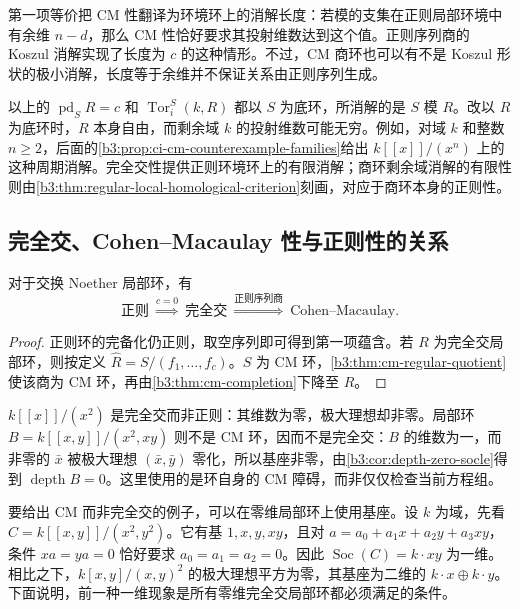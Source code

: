 第一项等价把 CM 性翻译为环境环上的消解长度：若模的支集在正则局部环境中有余维 \(n-d\)，那么 CM 性恰好要求其投射维数达到这个值。正则序列商的 Koszul 消解实现了长度为 \(c\) 的这种情形。不过，CM 商环也可以有不是 Koszul 形状的极小消解，长度等于余维并不保证关系由正则序列生成。

\ProseParagraphBreak
以上的 \(\operatorname{pd}_SR=c\) 和 \(\operatorname{Tor}_i^S(k,R)\) 都以 \(S\) 为底环，所消解的是 \(S\) 模 \(R\)。改以 \(R\) 为底环时，\(R\) 本身自由，而剩余域 \(k\) 的投射维数可能无穷。例如，对域 \(k\) 和整数 \(n\ge2\)，后面的\cref{b3:prop:ci-cm-counterexample-families}给出 \(k[\![x]\!]/(x^n)\) 上的这种周期消解。完全交性提供正则环境环上的有限消解；商环剩余域消解的有限性则由\cref{b3:thm:regular-local-homological-criterion}刻画，对应于商环本身的正则性。

\subsection{完全交、Cohen–Macaulay 性与正则性的关系}
\label{b3:subsec:1903:03}

\begin{theorem}\label{b3:thm:complete-intersection-cm}
	对于交换 Noether 局部环，有
	\[
		\text{正则}\ \overset{c=0}{\Longrightarrow}\ \text{完全交} \ \overset{\text{正则序列商}}{\Longrightarrow}\ \text{Cohen--Macaulay}.
	\]
\end{theorem}
\begin{proof}
	正则环的完备化仍正则，取空序列即可得到第一项蕴含。若 \(R\) 为完全交局部环，则按定义 \(\widehat R=S/(f_1,\ldots,f_c)\)。\(S\) 为 CM 环，\cref{b3:thm:cm-regular-quotient}使该商为 CM 环，再由\cref{b3:thm:cm-completion}下降至 \(R\)。
\end{proof}

\(k[\![x]\!]/(x^2)\) 是完全交而非正则：其维数为零，极大理想却非零。局部环 \(B=k[\![x,y]\!]/(x^2,xy)\) 则不是 CM 环，因而不是完全交：\(B\) 的维数为一，而非零的 \(\bar x\) 被极大理想 \((\bar x,\bar y)\) 零化，所以基座非零，由\cref{b3:cor:depth-zero-socle}得到 \(\operatorname{depth}B=0\)。这里使用的是环自身的 CM 障碍，而非仅仅检查当前方程组。

\ProseParagraphBreak
要给出 CM 而非完全交的例子，可以在零维局部环上使用基座。设 \(k\) 为域，先看 \(C=k[\![x,y]\!]/(x^2,y^2)\)。它有基 \(1,x,y,xy\)，且对 \(a=a_0+a_1x+a_2y+a_3xy\)，条件 \(xa=ya=0\) 恰好要求 \(a_0=a_1=a_2=0\)。因此 \(\operatorname{Soc}(C)=k\cdot xy\) 为一维。相比之下，\(k[x,y]/(x,y)^2\) 的极大理想平方为零，其基座为二维的 \(k\cdot x\oplus k\cdot y\)。下面说明，前一种一维现象是所有零维完全交局部环都必须满足的条件。

